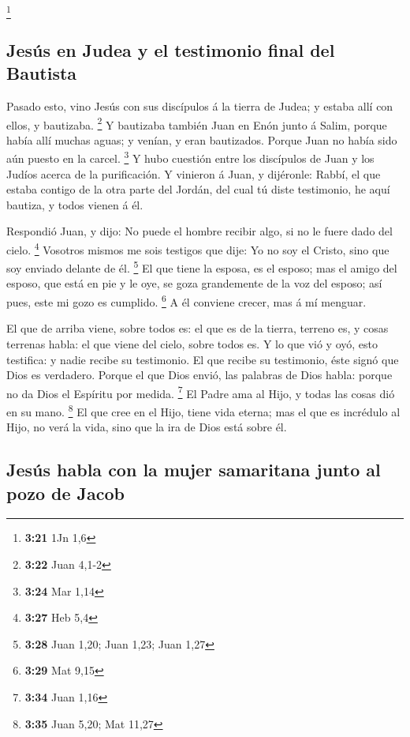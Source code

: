 \footnote{\textbf{3:21} 1Jn 1,6}

\hypertarget{jesuxfas-en-judea-y-el-testimonio-final-del-bautista}{%
\subsection{Jesús en Judea y el testimonio final del
Bautista}\label{jesuxfas-en-judea-y-el-testimonio-final-del-bautista}}

 Pasado esto, vino Jesús con sus discípulos á la tierra
de Judea; y estaba allí con ellos, y bautizaba. \footnote{\textbf{3:22}
  Juan 4,1-2}  Y bautizaba también Juan en Enón junto á
Salim, porque había allí muchas aguas; y venían, y eran bautizados.
 Porque Juan no había sido aún puesto en la carcel.
\footnote{\textbf{3:24} Mar 1,14}  Y hubo cuestión entre
los discípulos de Juan y los Judíos acerca de la purificación.
 Y vinieron á Juan, y dijéronle: Rabbí, el que estaba
contigo de la otra parte del Jordán, del cual tú diste testimonio, he
aquí bautiza, y todos vienen á él.

 Respondió Juan, y dijo: No puede el hombre recibir algo,
si no le fuere dado del cielo. \footnote{\textbf{3:27} Heb 5,4}
 Vosotros mismos me sois testigos que dije: Yo no soy el
Cristo, sino que soy enviado delante de él. \footnote{\textbf{3:28} Juan
  1,20; Juan 1,23; Juan 1,27}  El que tiene la esposa, es
el esposo; mas el amigo del esposo, que está en pie y le oye, se goza
grandemente de la voz del esposo; así pues, este mi gozo es cumplido.
\footnote{\textbf{3:29} Mat 9,15}  A él conviene crecer,
mas á mí menguar.

 El que de arriba viene, sobre todos es: el que es de la
tierra, terreno es, y cosas terrenas habla: el que viene del cielo,
sobre todos es.  Y lo que vió y oyó, esto testifica: y
nadie recibe su testimonio.  El que recibe su testimonio,
éste signó que Dios es verdadero.  Porque el que Dios
envió, las palabras de Dios habla: porque no da Dios el Espíritu por
medida. \footnote{\textbf{3:34} Juan 1,16}  El Padre ama
al Hijo, y todas las cosas dió en su mano. \footnote{\textbf{3:35} Juan
  5,20; Mat 11,27}  El que cree en el Hijo, tiene vida
eterna; mas el que es incrédulo al Hijo, no verá la vida, sino que la
ira de Dios está sobre él.

\hypertarget{jesuxfas-habla-con-la-mujer-samaritana-junto-al-pozo-de-jacob}{%
\subsection{Jesús habla con la mujer samaritana junto al pozo de
Jacob}\label{jesuxfas-habla-con-la-mujer-samaritana-junto-al-pozo-de-jacob}}

